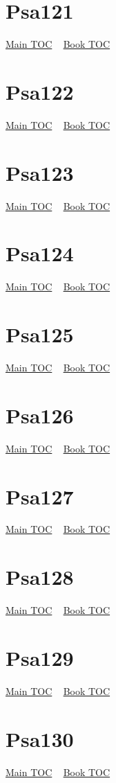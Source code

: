 \documentclass{book}
\begin{document}
  \section{Psa121}\hyperlink{toc}{Main TOC} ~ \hyperref[subsec:Psa]{Book TOC} 
  \section{Psa122}\hyperlink{toc}{Main TOC} ~ \hyperref[subsec:Psa]{Book TOC} 
  \section{Psa123}\hyperlink{toc}{Main TOC} ~ \hyperref[subsec:Psa]{Book TOC} 
  \section{Psa124}\hyperlink{toc}{Main TOC} ~ \hyperref[subsec:Psa]{Book TOC} 
  \section{Psa125}\hyperlink{toc}{Main TOC} ~ \hyperref[subsec:Psa]{Book TOC} 
  \section{Psa126}\hyperlink{toc}{Main TOC} ~ \hyperref[subsec:Psa]{Book TOC} 
  \section{Psa127}\hyperlink{toc}{Main TOC} ~ \hyperref[subsec:Psa]{Book TOC} 
  \section{Psa128}\hyperlink{toc}{Main TOC} ~ \hyperref[subsec:Psa]{Book TOC} 
  \section{Psa129}\hyperlink{toc}{Main TOC} ~ \hyperref[subsec:Psa]{Book TOC} 
  \section{Psa130}\hyperlink{toc}{Main TOC} ~ \hyperref[subsec:Psa]{Book TOC} 
\end{document}
